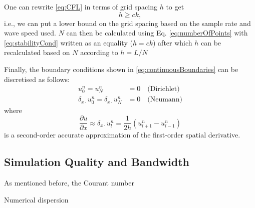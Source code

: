 \documentclass[preprint]{JASA}
\begin{document}
One can rewrite \eqref{eq:CFL} in terms of grid spacing $h$ to get
\begin{equation}\label{eq:stabilityCond}
    h \geq ck,
\end{equation}
i.e., we can put a lower bound on the grid spacing based on the sample rate and wave speed used. $N$ can then be calculated using Eq. \eqref{eq:numberOfPoints} with \eqref{eq:stabilityCond} written as an equality ($h = ck$) after which $h$ can be recalculated based on $N$ according to $h = L/N$

Finally, the boundary conditions shown in \eqref{eq:continuousBoundaries} can be discretised as follows:
\begin{align}
    u_0^n = u_N^n &= 0 \quad\text{(Dirichlet)}\\
    \delta_{x\cdot} u_0^n = \delta_{x\cdot} u_N^n &= 0 \quad \text{(Neumann)}
\end{align}
where 
\begin{equation}
    \frac{\partial u}{\partial x} \approx \delta_{x\cdot}u_l^n = \frac{1}{2h}\left(u_{l+1}^n - u_{l-1}^n\right)
\end{equation}
is a second-order accurate approximation of the first-order spatial derivative.

\subsection{Simulation Quality and Bandwidth}
As mentioned before, the Courant number 

Numerical dispersion

\end{document}

